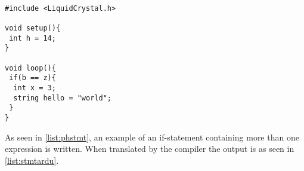 \begin{lstlisting}[caption=Example of an if-statement in the Arduino language translated by the compiler from PH, label=list:stmtardu]

#include <LiquidCrystal.h>

void setup(){
 int h = 14;
}

void loop(){
 if(b == z){
  int x = 3;
  string hello = "world";
 }
}
\end{lstlisting}

As seen in \ref{list:phstmt}, an example of an if-statement containing more than one expression is written. When translated by the compiler the output is as seen in \ref{list:stmtardu}. 




